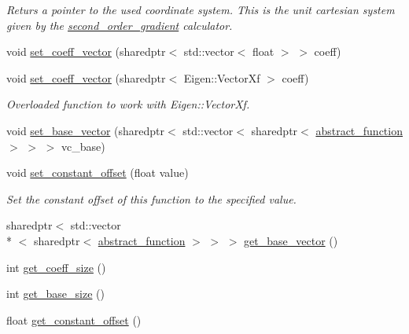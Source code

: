 \begin{DoxyCompactItemize}
\begin{DoxyCompactList}\small\item\em Returs a pointer to the used coordinate system. This is the unit cartesian system given by the \hyperlink{classsecond__order__gradient}{second\-\_\-order\-\_\-gradient} calculator. \end{DoxyCompactList}\item 
void \hyperlink{classmodel__function_ace253fd777dee5695cc0b8b3591e0fc7}{set\-\_\-coeff\-\_\-vector} (sharedptr$<$ std\-::vector$<$ float $>$ $>$ coeff)
\item 
\hypertarget{classmodel__function_ad83f4720b10229ae6369a85bc9606bdf}{void \hyperlink{classmodel__function_ad83f4720b10229ae6369a85bc9606bdf}{set\-\_\-coeff\-\_\-vector} (sharedptr$<$ Eigen\-::\-Vector\-Xf $>$ coeff)}\label{classmodel__function_ad83f4720b10229ae6369a85bc9606bdf}

\begin{DoxyCompactList}\small\item\em Overloaded function to work with Eigen\-::\-Vector\-Xf. \end{DoxyCompactList}\item 
void \hyperlink{classmodel__function_a4064f37008f43c8921c3ca20541eb75c}{set\-\_\-base\-\_\-vector} (sharedptr$<$ std\-::vector$<$ sharedptr$<$ \hyperlink{classabstract__function}{abstract\-\_\-function} $>$ $>$ $>$ vc\-\_\-base)
\item 
\hypertarget{classmodel__function_a776e5515af16cc021e7ff72ad6e10bad}{void \hyperlink{classmodel__function_a776e5515af16cc021e7ff72ad6e10bad}{set\-\_\-constant\-\_\-offset} (float value)}\label{classmodel__function_a776e5515af16cc021e7ff72ad6e10bad}

\begin{DoxyCompactList}\small\item\em Set the constant offset of this function to the specified value. \end{DoxyCompactList}\item 
sharedptr$<$ std\-::vector\\*
$<$ sharedptr$<$ \hyperlink{classabstract__function}{abstract\-\_\-function} $>$ $>$ $>$ \hyperlink{classmodel__function_a6c3b24ae19c7178775002a5178487f9e}{get\-\_\-base\-\_\-vector} ()
\item 
int \hyperlink{classmodel__function_a9af5216fc0b4964b4269ff4babee4c4d}{get\-\_\-coeff\-\_\-size} ()
\item 
int \hyperlink{classmodel__function_acfbb42766697bfc2dcaeb045e5ab60d0}{get\-\_\-base\-\_\-size} ()
\item 
\hypertarget{classmodel__function_abad3b2aa7dab1fe6cb7e657166a608dc}{float \hyperlink{classmodel__function_abad3b2aa7dab1fe6cb7e657166a608dc}{get\-\_\-constant\-\_\-offset} ()}\label{classmodel__function_abad3b2aa7dab1fe6cb7e657166a608dc}


\end{DoxyCompactItemize}

